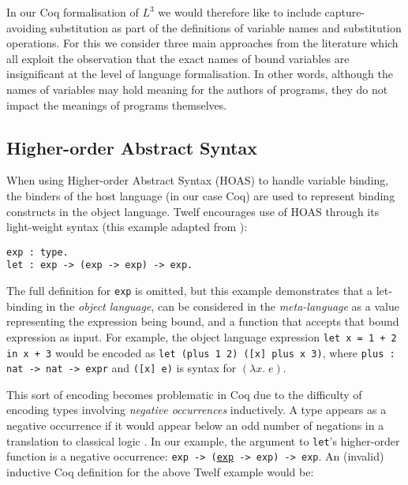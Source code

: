 \documentclass[]{unswthesis}
\begin{document}

In our Coq formalisation of $L^3$ we would therefore like to include capture-avoiding substitution as part of the definitions of variable names and substitution operations. For this we consider three main approaches from the literature which all exploit the observation that the exact names of bound variables are insignificant at the level of language formalisation. In other words, although the names of variables may hold meaning for the authors of programs, they do not impact the meanings of programs themselves.

\subsection{Higher-order Abstract Syntax}

When using Higher-order Abstract Syntax (HOAS) to handle variable binding, the binders of the host language (in our case Coq) are used to represent binding constructs in the object language. Twelf encourages use of HOAS through its light-weight syntax (this example adapted from \cite{twelf08}):

\begin{verbatim}
exp : type.
let : exp -> (exp -> exp) -> exp.
\end{verbatim}

The full definition for \texttt{exp} is omitted, but this example demonstrates that a let-binding in the \textit{object language}, can be considered in the \textit{meta-language} as a value representing the expression being bound, and a function that accepts that bound expression as input. For example, the object language expression \texttt{let x = 1 + 2 in x + 3} would be encoded as \texttt{let (plus 1 2) ([x] plus x 3)}, where \texttt{plus : nat -> nat -> expr} and \texttt{([x] e)} is syntax for $(\lambda x. \; e)$.

This sort of encoding becomes problematic in Coq due to the difficulty of encoding types involving \textit{negative occurrences} inductively. A type appears as a negative occurrence if it would appear below an odd number of negations in a translation to classical logic \cite{tapl}. In our example, the argument to \texttt{let}'s higher-order function is a negative occurrence: \texttt{exp -> (\underline{exp} -> exp) -> exp}. An (invalid) inductive Coq definition for the above Twelf example would be:
\end{document}
